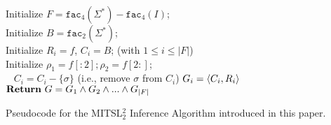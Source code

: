 \documentclass[11pt,a4paper]{article}
\newcommand{\facn}[1]{\ensuremath{\texttt{fac}_{#1}}}
\begin{document}

\begin{algorithm}[!ht]
    Initialize $F=\facn{4}(\Sigma^*)-\facn{4}(I)$; \\
    Initialize $B=\facn{2}(\Sigma^*)$; \\
        	{
            Initialize $R_i=f$, $C_i=B$; (with $1 \leq i \leq  |F|$) \\
             Initialize $\rho_1 = f[:2] ;\rho_2 = f[2:]$;\\
            	{
                	~
    					{$C_i=C_i-\{\sigma\}$ (i.e., remove $\sigma$ from $C_i$)}}
					$G_i=\langle{C_i,R_i}\rangle$
                }
            $\mathbf{Return}\textnormal{ }G=G_1\wedge G_2\wedge ... \wedge G_{|F|}$
            \medskip
	\caption{Pseudocode for the MITSL$^2_2$ Inference Algorithm introduced in this paper.}
\end{algorithm}
\end{document}

